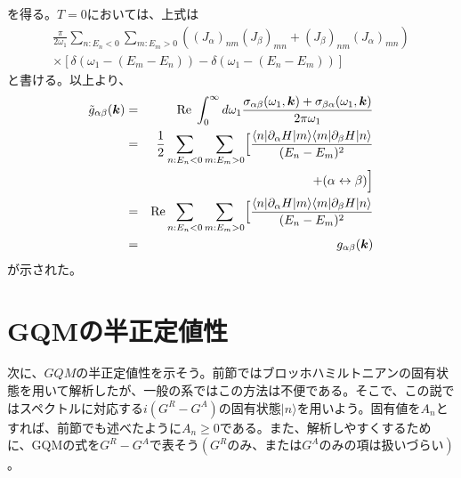 \documentclass[12pt]{jsbook}
\newcommand{\ra}{\rangle}
\newcommand{\bk}{\bm{k}}
\begin{document}
を得る。$T=0$においては、上式は
\begin{eqnarray}
\frac{\pi}{2\omega_1}\displaystyle \sum_{n:E_n<0}\displaystyle \sum_{m:E_m>0}((J_\alpha)_{nm}(J_\beta)_{mn}+(J_\beta )_{nm}(J_\alpha)_{mn})\nonumber \\
\times [\delta(\omega_1-(E_m-E_n))-\delta(\omega_1-(E_n-E_m))]
\end{eqnarray}
と書ける。以上より、
\begin{eqnarray}
\tilde{g}_{\alpha\beta}(\bk) &=& \mathrm{Re} \;\int_{0}^{\infty}d\omega_1\frac{\sigma_{\alpha\beta}(\omega_1,\bk) + \sigma_{\beta{\alpha}}(\omega_1,\bk)}{2\pi\omega_1}\\
&=& \frac{1}{2}\displaystyle \sum_{n:E_n<0}\displaystyle \sum_{m:E_m>0} \Bigl[\frac{\langle n|\partial_\alpha H |m\rangle\langle m|\partial_\beta H |n\rangle}{(E_n-E_m)^2}\nonumber\\
&& \ \ \ \ \ \  + (\alpha \leftrightarrow \beta)\Bigr]\nonumber\\
&=& \mathrm{Re} \displaystyle \sum_{n:E_n<0}\displaystyle \sum_{m:E_m>0} \Bigl[\frac{\langle n|\partial_\alpha H |m\rangle\langle m|\partial_\beta H |n\rangle}{(E_n-E_m)^2}\\
&=&{g}_{\alpha\beta}(\bk)\label{existing}
\end{eqnarray}
が示された。
\section{GQMの半正定値性}
次に、$GQM$の半正定値性を示そう。前節ではブロッホハミルトニアンの固有状態を用いて解析したが、一般の系ではこの方法は不便である。そこで、この説ではスペクトルに対応する$i(G^{R} - G^{A})$の固有状態$|n\ra$を用いよう。固有値を$A_n$とすれば、前節でも述べたように$A_n\geq 0$である。また、解析しやすくするために、GQMの式を$G^R-G^A$で表そう$(G^Rのみ、またはG^Aのみの項は扱いづらい)$。
\end{document}

